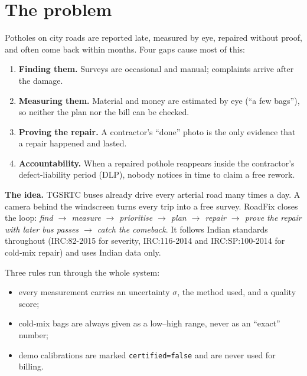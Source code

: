 \documentclass[11pt,a4paper]{article}
\newcommand{\code}[1]{\texttt{\small #1}}
\begin{document}
\section{The problem}\label{sec:problem}

Potholes on city roads are reported late, measured by eye, repaired without proof, and often come back within
months. Four gaps cause most of this:
\begin{enumerate}
  \item \textbf{Finding them.} Surveys are occasional and manual; complaints arrive after the damage.
  \item \textbf{Measuring them.} Material and money are estimated by eye (``a few bags''), so neither the plan nor the
        bill can be checked.
  \item \textbf{Proving the repair.} A contractor's ``done'' photo is the only evidence that a repair happened and
        lasted.
  \item \textbf{Accountability.} When a repaired pothole reappears inside the contractor's defect-liability period
        (DLP), nobody notices in time to claim a free rework.
\end{enumerate}

\textbf{The idea.} TGSRTC buses already drive every arterial road many times a day. A camera behind the
windscreen turns every trip into a free survey. RoadFix closes the loop:
\emph{find $\rightarrow$ measure $\rightarrow$ prioritise $\rightarrow$ plan $\rightarrow$ repair $\rightarrow$ prove
the repair with later bus passes $\rightarrow$ catch the comeback}. It follows Indian standards throughout
(IRC:82-2015 for severity, IRC:116-2014 and IRC:SP:100-2014 for cold-mix repair) and uses Indian data only.

Three rules run through the whole system:
\begin{itemize}
  \item every measurement carries an uncertainty $\sigma$, the method used, and a quality score;
  \item cold-mix bags are always given as a low--high range, never as an ``exact'' number;
  \item demo calibrations are marked \code{certified=false} and are never used for billing.
\end{itemize}

\end{document}
